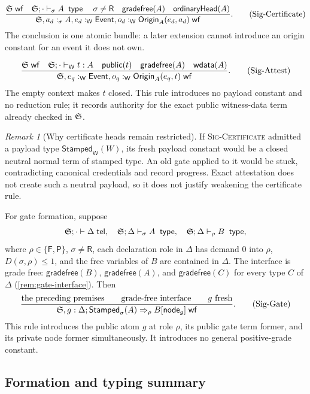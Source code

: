 \documentclass[11pt]{article}
\numberwithin{equation}{section}
\theoremstyle{definition}
\theoremstyle{plain}
\theoremstyle{remark}
\newtheorem{remark}[definition]{Remark}
\newcommand{\Event}{\mathsf{Event}}
\newcommand{\Origin}{\mathsf{Origin}}
\newcommand{\Stamped}{\mathsf{Stamped}}
\newcommand{\Frm}{\mathsf F}
\newcommand{\Prs}{\mathsf P}
\newcommand{\Wit}{\mathsf W}
\newcommand{\Ren}{\mathsf R}
\newcommand{\jtype}{\mathrel{\mathsf{type}}}
\newcommand{\wf}{\mathsf{wf}}
\begin{document}
\[
\frac{
 \AFDeclSignature\;\wf
 \quad \AFDeclSignature;\cdot\vdash_{\sigma} A\;\jtype
 \quad \sigma\ne\Ren
 \quad \mathsf{gradefree}(A)
 \quad \mathsf{ordinaryHead}(A)
}{
 \AFDeclSignature,
 a_d:_{\sigma}A,
 e_d:_{\Wit}\Event,
 o_d:_{\Wit}\Origin_A(e_d,a_d)
 \;\wf
}.
\tag{Sig-Certificate}
\]
The conclusion is one atomic bundle: a later extension cannot introduce an
origin constant for an event it does not own.

\[
\frac{
 \AFDeclSignature\;\wf
 \quad \AFDeclSignature;\cdot\vdash_{\Wit} t:A
 \quad \mathsf{public}(t)
 \quad \mathsf{gradefree}(A)
 \quad \mathsf{wdata}(A)
}{
 \AFDeclSignature,
 e_q:_{\Wit}\Event,
 o_q:_{\Wit}\Origin_A(e_q,t)
 \;\wf
}.
\tag{Sig-Attest}
\]
The empty context makes \(t\) closed.  This rule introduces no payload
constant and no reduction rule; it records authority for the exact public
witness-data term already checked in \({\mathfrak S}\).

\begin{remark}[Why certificate heads remain restricted]
If \textsc{Sig-Certificate} admitted a payload type
\(\Stamped_{\Wit}(W)\), its fresh payload constant would be a closed neutral
normal term of stamped type.  An old gate applied to it would be stuck,
contradicting canonical credentials and record progress.  Exact attestation
does not create such a neutral payload, so it does not justify weakening the
certificate rule.
\end{remark}

For gate formation, suppose
\[
 \AFDeclSignature;\cdot\vdash\Delta\;\mathsf{tel},
 \quad
 \AFDeclSignature;\Delta\vdash_{\sigma} A\;\jtype,
 \quad
 \AFDeclSignature;\Delta\vdash_{\rho} B\;\jtype,
\]
where \(\rho\in\{\Frm,\Prs\}\), \(\sigma\ne\Ren\), each declaration role in
\(\Delta\) has demand \(0\) into \(\rho\), \(D(\sigma,\rho)\le1\), and the
free variables of \(B\) are contained in \(\Delta\).  The interface is grade
free: \(\mathsf{gradefree}(B)\), \(\mathsf{gradefree}(A)\), and
\(\mathsf{gradefree}(C)\) for every type \(C\) of \(\Delta\)
(\cref{rem:gate-interface}).  Then
\[
\frac{\text{the preceding premises}\qquad
      \text{grade-free interface}\qquad g\text{ fresh}}
{\AFDeclSignature,
 g:\Delta;\Stamped_\sigma(A)\Rightarrow_{\rho} B
 [\mathsf{node}_g]\;\wf}.
\tag{Sig-Gate}
\]
This rule introduces the public atom \(g\) at role \(\rho\), its public gate term former,
and its private node former simultaneously.  It introduces no general
positive-grade constant.

\subsection{Formation and typing summary}
\end{document}
